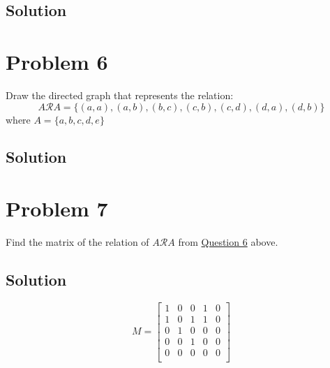 \documentclass[article, 12pt]{article}
\theoremstyle{definition}
\newcommand{\rel}{\mathcal{R}} %
\begin{document}
    \subsection*{Solution}
    \pagebreak
    \section*{Problem 6} \label{question}
    Draw the directed graph that represents the relation: 
    \[ A \rel A=\{( a, a), ( a, b), ( b, c), ( c, b), ( c, d), ( d, a), ( d, b)\} \]
    where $A=\{a, b,c,d,e\}$
    \subsection*{Solution}
    \begin{figure}[H]
        \centering
    \end{figure}
    \pagebreak
    \section*{Problem 7}
    Find the matrix of the relation of $A \rel A$  from \hyperref[question]{Question 6} above.
    \subsection*{Solution}
    \[ M = \begin{bmatrix}
        1 & 0 & 0 & 1 & 0 \\
        1 & 0 & 1 & 1 & 0 \\
        0 & 1 & 0 & 0 & 0 \\
        0 & 0 & 1 & 0 & 0 \\ 
        0 & 0 & 0 & 0 & 0 \\
    \end{bmatrix} \]
    \pagebreak
\end{document}
